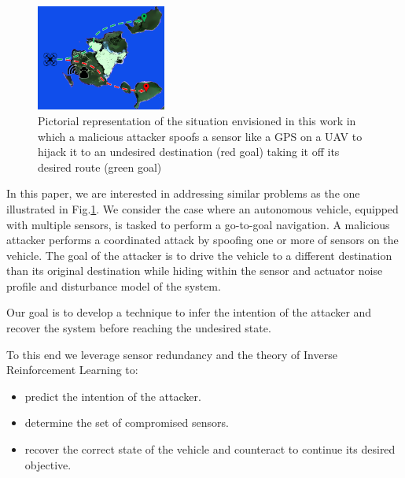 \documentclass[letterpaper, 10 pt, conference]{ieeeconf}  %
\begin{document}
\begin{figure}[t]
\centering
\includegraphics[width=0.38\textwidth]{problem}
\caption{Pictorial representation of the situation envisioned in this work in which a malicious attacker spoofs a sensor like a GPS on a UAV to hijack it to an undesired destination (red goal) taking it off its desired route (green goal)}
 \label{fig:problem}
\end{figure}


In this paper, we are interested in addressing similar problems as the one illustrated in Fig.\ref{fig:problem}. We consider the case where an autonomous vehicle, equipped with multiple sensors, is tasked to perform a go-to-goal navigation. 
A malicious attacker performs a coordinated attack by spoofing one or more of sensors on the vehicle. The goal of the attacker is to drive the vehicle to a different destination than its original destination while hiding within the sensor and actuator noise profile and disturbance model of the system. 

Our goal is to develop a technique to infer the intention of the attacker and recover the system before reaching the undesired state. 


To this end we leverage sensor redundancy and the theory of Inverse Reinforcement Learning to:
\begin{itemize}
    \item predict the intention of the attacker.
    \item determine the set of compromised sensors.
    \item recover the correct state of the vehicle and counteract to continue its desired objective. 
\end{itemize}
\end{document}
